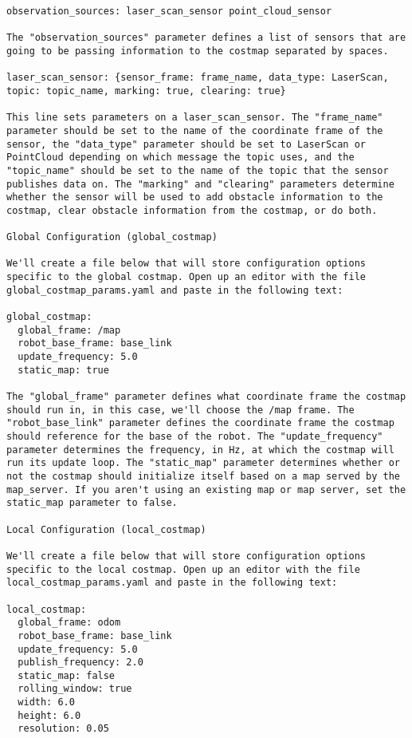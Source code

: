 \begin{verbatim}
observation_sources: laser_scan_sensor point_cloud_sensor

The "observation_sources" parameter defines a list of sensors that are going to be passing information to the costmap separated by spaces.

laser_scan_sensor: {sensor_frame: frame_name, data_type: LaserScan, topic: topic_name, marking: true, clearing: true}

This line sets parameters on a laser_scan_sensor. The "frame_name" parameter should be set to the name of the coordinate frame of the sensor, the "data_type" parameter should be set to LaserScan or PointCloud depending on which message the topic uses, and the "topic_name" should be set to the name of the topic that the sensor publishes data on. The "marking" and "clearing" parameters determine whether the sensor will be used to add obstacle information to the costmap, clear obstacle information from the costmap, or do both.

Global Configuration (global_costmap)

We'll create a file below that will store configuration options specific to the global costmap. Open up an editor with the file global_costmap_params.yaml and paste in the following text:

global_costmap:
  global_frame: /map
  robot_base_frame: base_link
  update_frequency: 5.0
  static_map: true

The "global_frame" parameter defines what coordinate frame the costmap should run in, in this case, we'll choose the /map frame. The "robot_base_link" parameter defines the coordinate frame the costmap should reference for the base of the robot. The "update_frequency" parameter determines the frequency, in Hz, at which the costmap will run its update loop. The "static_map" parameter determines whether or not the costmap should initialize itself based on a map served by the map_server. If you aren't using an existing map or map server, set the static_map parameter to false.

Local Configuration (local_costmap)

We'll create a file below that will store configuration options specific to the local costmap. Open up an editor with the file local_costmap_params.yaml and paste in the following text:

local_costmap:
  global_frame: odom
  robot_base_frame: base_link
  update_frequency: 5.0
  publish_frequency: 2.0
  static_map: false
  rolling_window: true
  width: 6.0
  height: 6.0
  resolution: 0.05


\end{verbatim}
